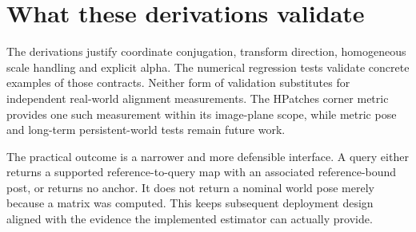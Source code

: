 \section{What these derivations validate}
The derivations justify coordinate conjugation, transform direction, homogeneous scale handling and explicit alpha. The numerical regression tests validate concrete examples of those contracts. Neither form of validation substitutes for independent real-world alignment measurements. The HPatches corner metric provides one such measurement within its image-plane scope, while metric pose and long-term persistent-world tests remain future work.

The practical outcome is a narrower and more defensible interface. A query either returns a supported reference-to-query map with an associated reference-bound post, or returns no anchor. It does not return a nominal world pose merely because a matrix was computed. This keeps subsequent deployment design aligned with the evidence the implemented estimator can actually provide.
